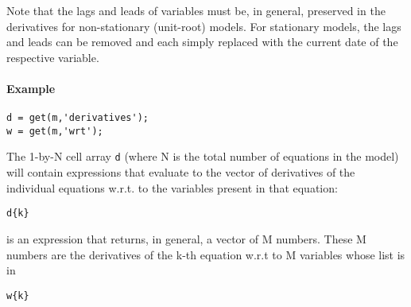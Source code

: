 Note that the lags and leads of variables must be, in general, preserved
in the derivatives for non-stationary (unit-root) models. For stationary
models, the lags and leads can be removed and each simply replaced with
the current date of the respective variable.

\paragraph{Example}\label{example}

\begin{verbatim}
d = get(m,'derivatives');
w = get(m,'wrt');
\end{verbatim}

The 1-by-N cell array \texttt{d} (where N is the total number of
equations in the model) will contain expressions that evaluate to the
vector of derivatives of the individual equations w.r.t. to the
variables present in that equation:

\begin{verbatim}
d{k}
\end{verbatim}

is an expression that returns, in general, a vector of M numbers. These
M numbers are the derivatives of the k-th equation w.r.t to M variables
whose list is in

\begin{verbatim}
w{k}
\end{verbatim}


